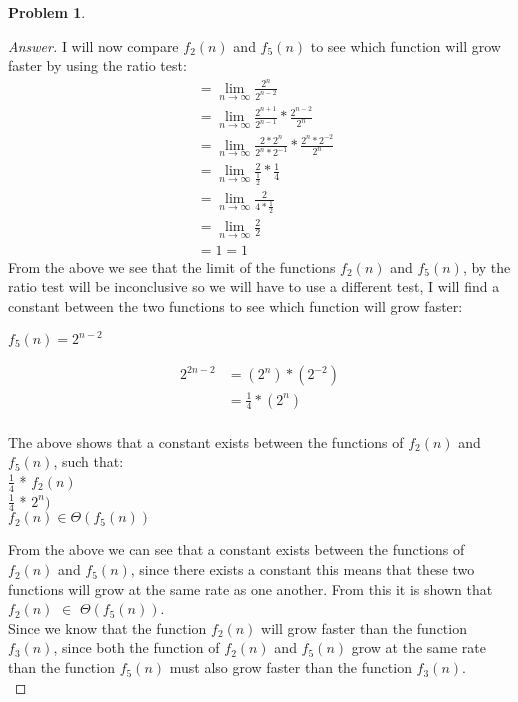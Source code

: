 \documentclass[11pt]{article}
\theoremstyle{definition}
\theoremstyle{definition}
\newtheorem{required}{Problem}
\theoremstyle{definition}
\begin{document}
\begin{required}
\begin{enumerate}[label=(\alph*)]
\begin{proof}[Answer]
I will now compare $f_2(n)$ and $f_5(n)$ to see which function will grow faster by using the ratio test: \\
\begin{align*}
&= \lim_{n \to \infty} \frac{2^n}{2^{n-2}} \\
&= \lim_{n \to \infty} \frac{2^{n+1}}{2^{n-1}} * \frac{2^{n-2}}{2^{n}} \\
&= \lim_{n \to \infty} \frac{2*2^{n}}{2^{n}*2^{-1}} * \frac{2^{n}*2^{-2}}{2^{n}} \\
&= \lim_{n \to \infty} \frac{2}{\frac{1}{2}} * \frac{1}{4}\\
&= \lim_{n \to \infty} \frac{2}{4*\frac{1}{2}} \\
&= \lim_{n \to \infty} \frac{2}{2} \\
&= 1 = 1
\end{align*}
From the above we see that the limit of the functions $f_2(n)$ and $f_5(n)$, by the ratio test will be inconclusive so we will have to use a different test, I will find a constant between the two functions to see which function will grow faster: \\
\begin{center}
$f_5(n) = 2^{n-2} $
\end{center} 
\begin{align*}
2^{2n-2} &= (2^n) * (2^{-2}) \\
&= \frac{1}{4} * (2^n) \\
\end{align*}
\begin{center}
The above shows that a constant exists between the functions of $f_2(n)$ and $f_5(n)$, such that: \\
$\frac{1}{4}$ * $f_2(n)$ \\
$\frac{1}{4}$ * $2^{n})$ \\
$f_2(n)$$\in$$\Theta(f_5(n))$ \\
\end{center}
From the above we can see that a constant exists between the functions of $f_2(n)$ and $f_5(n)$, since there exists a constant this means that these two functions will grow at the same rate as one another. From this it is shown that  $f_2(n)$ $\in$ $\Theta(f_5(n))$. \\

Since we know that the function  $f_2(n)$ will grow faster than the function $f_3(n)$, since both the function of  $f_2(n)$ and $f_5(n)$ grow at the same rate than the function $f_5(n)$ must also grow faster than the function $f_3(n)$. \\


\end{proof}
\end{enumerate}
\end{required}
\end{document}
